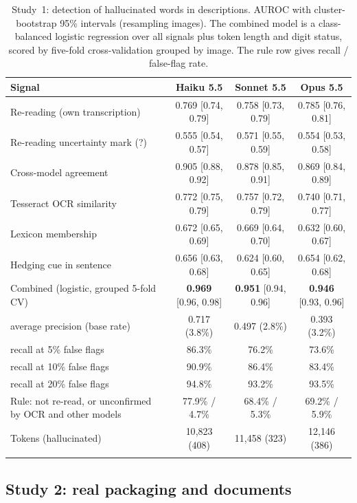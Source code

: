 \documentclass[pdflatex,sn-mathphys-num]{sn-jnl}%
\theoremstyle{thmstyleone}%
\theoremstyle{thmstyletwo}%
\theoremstyle{thmstylethree}%
\begin{document}
\begin{table}[!tbp]
\caption{Study~1: detection of hallucinated words in descriptions. AUROC with cluster-bootstrap 95\% intervals (resampling images). The combined model is a class-balanced logistic regression over all signals plus token length and digit status, scored by five-fold cross-validation grouped by image. The rule row gives recall / false-flag rate.}\label{tab:detect}
\footnotesize
\begin{tabular*}{\textwidth}{@{\extracolsep\fill}lccc}
\toprule
Signal & Haiku 5.5 & Sonnet 5.5 & Opus 5.5 \\
\midrule
Re-reading (own transcription) & 0.769 [0.74, 0.79] & 0.758 [0.73, 0.79] & 0.785 [0.76, 0.81] \\
Re-reading uncertainty mark (?) & 0.555 [0.54, 0.57] & 0.571 [0.55, 0.59] & 0.554 [0.53, 0.58] \\
Cross-model agreement & 0.905 [0.88, 0.92] & 0.878 [0.85, 0.91] & 0.869 [0.84, 0.89] \\
Tesseract OCR similarity & 0.772 [0.75, 0.79] & 0.757 [0.72, 0.79] & 0.740 [0.71, 0.77] \\
Lexicon membership & 0.672 [0.65, 0.69] & 0.669 [0.64, 0.70] & 0.632 [0.60, 0.67] \\
Hedging cue in sentence & 0.656 [0.63, 0.68] & 0.624 [0.60, 0.65] & 0.654 [0.62, 0.68] \\
\midrule
Combined (logistic, grouped 5-fold CV) & \textbf{0.969} [0.96, 0.98] & \textbf{0.951} [0.94, 0.96] & \textbf{0.946} [0.93, 0.96] \\
\quad average precision (base rate) & 0.717 (3.8\%) & 0.497 (2.8\%) & 0.393 (3.2\%) \\
\quad recall at 5\% false flags & 86.3\% & 76.2\% & 73.6\% \\
\quad recall at 10\% false flags & 90.9\% & 86.4\% & 83.4\% \\
\quad recall at 20\% false flags & 94.8\% & 93.2\% & 93.5\% \\
Rule: not re-read, or unconfirmed by OCR and other models & 77.9\% / 4.7\% & 68.4\% / 5.3\% & 69.2\% / 5.9\% \\
Tokens (hallucinated) & 10{,}823 (408) & 11{,}458 (323) & 12{,}146 (386) \\
\botrule
\end{tabular*}
\end{table}

\subsection{Study 2: real packaging and documents}\label{sec:real}
\end{document}
